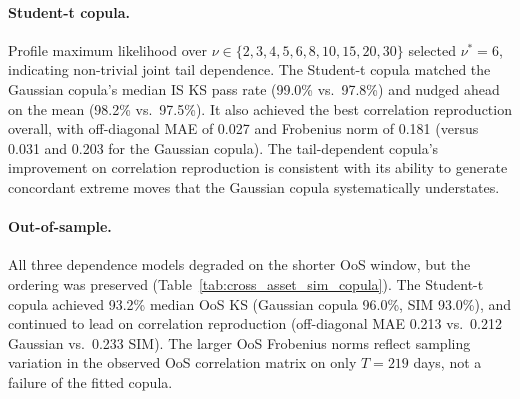 \paragraph{Student-t copula.}
Profile maximum likelihood over $\nu \in \{2, 3, 4, 5, 6, 8, 10, 15, 20, 30\}$ selected $\nu^* = 6$, indicating non-trivial joint tail dependence.
The Student-t copula matched the Gaussian copula's median IS KS pass rate (99.0\% vs.\ 97.8\%) and nudged ahead on the mean (98.2\% vs.\ 97.5\%).
It also achieved the best correlation reproduction overall, with off-diagonal MAE of 0.027 and Frobenius norm of 0.181 (versus 0.031 and 0.203 for the Gaussian copula).
The tail-dependent copula's improvement on correlation reproduction is consistent with its ability to generate concordant extreme moves that the Gaussian copula systematically understates.

\paragraph{Out-of-sample.}
All three dependence models degraded on the shorter OoS window, but the ordering was preserved (Table~\ref{tab:cross_asset_sim_copula}).
The Student-t copula achieved 93.2\% median OoS KS (Gaussian copula 96.0\%, SIM 93.0\%), and continued to lead on correlation reproduction (off-diagonal MAE 0.213 vs.\ 0.212 Gaussian vs.\ 0.233 SIM).
The larger OoS Frobenius norms reflect sampling variation in the observed OoS correlation matrix on only $T = 219$ days, not a failure of the fitted copula.

